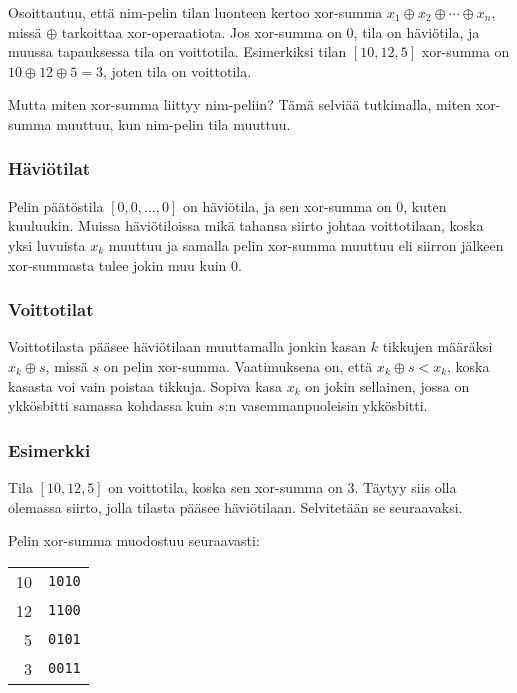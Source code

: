 Osoittautuu, että nim-pelin tilan luonteen
kertoo xor-summa $x_1 \oplus x_2 \oplus \cdots \oplus x_n$,
missä $\oplus$ tarkoittaa xor-operaatiota.
Jos xor-summa on 0, tila on häviötila,
ja muussa tapauksessa tila on voittotila.
Esimerkiksi tilan $[10,12,5]$ xor-summa on
$10 \oplus 12 \oplus 5 = 3$, joten tila on voittotila.

Mutta miten xor-summa liittyy nim-peliin?
Tämä selviää tutkimalla, miten xor-summa muuttuu,
kun nim-pelin tila muuttuu.

\subsubsection*{Häviötilat}

Pelin päätöstila $[0,0,\ldots,0]$ on häviötila,
ja sen xor-summa on 0, kuten kuuluukin.
Muissa häviötiloissa mikä tahansa siirto johtaa
voittotilaan, koska yksi luvuista $x_k$ muuttuu
ja samalla pelin xor-summa muuttuu
eli siirron jälkeen xor-summasta tulee jokin muu kuin 0.

\subsubsection*{Voittotilat}

Voittotilasta pääsee häviötilaan muuttamalla
jonkin kasan $k$ tikkujen määräksi $x_k \oplus s$,
missä $s$ on pelin xor-summa.
Vaatimuksena on, että $x_k \oplus s < x_k$,
koska kasasta voi vain poistaa tikkuja.
Sopiva kasa $x_k$ on jokin sellainen,
jossa on ykkösbitti samassa kohdassa kuin
$s$:n vasemmanpuoleisin ykkösbitti.

\subsubsection*{Esimerkki}

Tila $[10,12,5]$ on voittotila,
koska sen xor-summa on 3.
Täytyy siis olla olemassa siirto,
jolla tilasta pääsee häviötilaan.
Selvitetään se seuraavaksi.

Pelin xor-summa muodostuu seuraavasti:

\begin{center}
\begin{tabular}{r|r}
10 & \texttt{1010} \\
12 & \texttt{1100} \\
5 & \texttt{0101} \\
\hline
3 & \texttt{0011} \\
\end{tabular}
\end{center}


